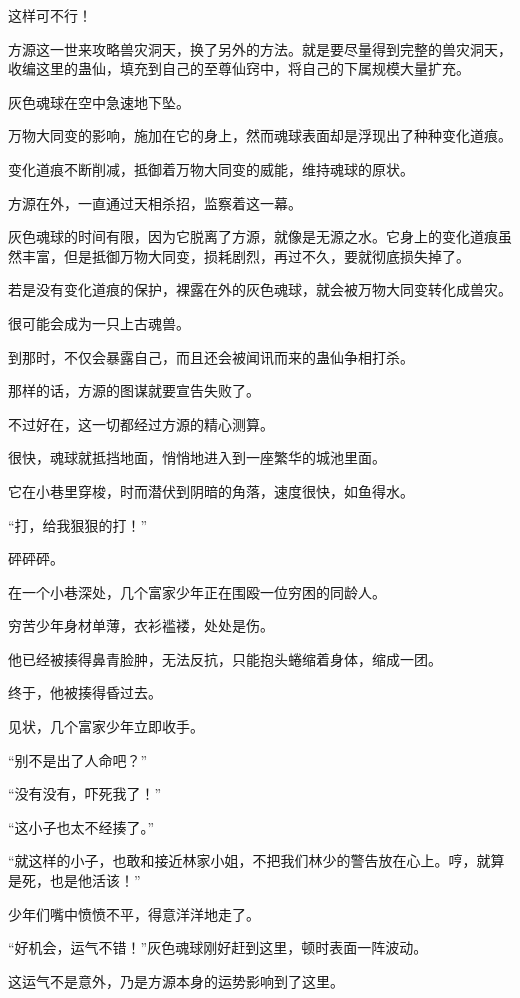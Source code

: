\begin{this_body}
这样可不行！

方源这一世来攻略兽灾洞天，换了另外的方法。就是要尽量得到完整的兽灾洞天，收编这里的蛊仙，填充到自己的至尊仙窍中，将自己的下属规模大量扩充。

灰色魂球在空中急速地下坠。

万物大同变的影响，施加在它的身上，然而魂球表面却是浮现出了种种变化道痕。

变化道痕不断削减，抵御着万物大同变的威能，维持魂球的原状。

方源在外，一直通过天相杀招，监察着这一幕。

灰色魂球的时间有限，因为它脱离了方源，就像是无源之水。它身上的变化道痕虽然丰富，但是抵御万物大同变，损耗剧烈，再过不久，要就彻底损失掉了。

若是没有变化道痕的保护，裸露在外的灰色魂球，就会被万物大同变转化成兽灾。

很可能会成为一只上古魂兽。

到那时，不仅会暴露自己，而且还会被闻讯而来的蛊仙争相打杀。

那样的话，方源的图谋就要宣告失败了。

不过好在，这一切都经过方源的精心测算。

很快，魂球就抵挡地面，悄悄地进入到一座繁华的城池里面。

它在小巷里穿梭，时而潜伏到阴暗的角落，速度很快，如鱼得水。

“打，给我狠狠的打！”

砰砰砰。

在一个小巷深处，几个富家少年正在围殴一位穷困的同龄人。

穷苦少年身材单薄，衣衫褴褛，处处是伤。

他已经被揍得鼻青脸肿，无法反抗，只能抱头蜷缩着身体，缩成一团。

终于，他被揍得昏过去。

见状，几个富家少年立即收手。

“别不是出了人命吧？”

“没有没有，吓死我了！”

“这小子也太不经揍了。”

“就这样的小子，也敢和接近林家小姐，不把我们林少的警告放在心上。哼，就算是死，也是他活该！”

少年们嘴中愤愤不平，得意洋洋地走了。

“好机会，运气不错！”灰色魂球刚好赶到这里，顿时表面一阵波动。

这运气不是意外，乃是方源本身的运势影响到了这里。


\end{this_body}
